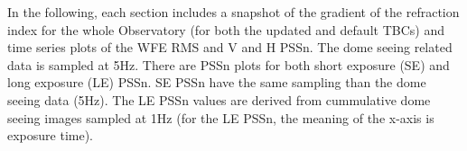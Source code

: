 \documentclass{gmto}
\begin{document}
In the following,
each section includes a snapshot of the gradient of the refraction index for the whole Observatory (for both the updated and default TBCs) and time series plots of the WFE RMS and V and H PSSn.
The dome seeing related data is sampled at 5Hz.
There are PSSn plots for both short exposure (SE) and long exposure (LE) PSSn.
SE PSSn have the same sampling than the dome seeing data (5Hz).
The LE PSSn values are derived from cummulative dome seeing images sampled at 1Hz (for the LE PSSn, the meaning of the x-axis is exposure time).



\printbibliography
\end{document}
